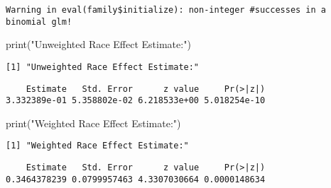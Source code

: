 \documentclass[
  letterpaper,
  DIV=11,
  numbers=noendperiod]{scrartcl}
\newenvironment{Shaded}{\begin{snugshade}}{\end{snugshade}}
\newcommand{\FunctionTok}[1]{\textcolor[rgb]{0.28,0.35,0.67}{#1}}
\newcommand{\NormalTok}[1]{\textcolor[rgb]{0.00,0.23,0.31}{#1}}
\newcommand{\SpecialCharTok}[1]{\textcolor[rgb]{0.37,0.37,0.37}{#1}}
\newcommand{\StringTok}[1]{\textcolor[rgb]{0.13,0.47,0.30}{#1}}
\begin{document}
\begin{verbatim}
Warning in eval(family$initialize): non-integer #successes in a binomial glm!
\end{verbatim}

\begin{Shaded}
\begin{Highlighting}[]
\FunctionTok{print}\NormalTok{(}\StringTok{"Unweighted Race Effect Estimate:"}\NormalTok{)}
\end{Highlighting}
\end{Shaded}

\begin{verbatim}
[1] "Unweighted Race Effect Estimate:"
\end{verbatim}

\begin{Shaded}
\end{Shaded}

\begin{verbatim}
    Estimate   Std. Error      z value     Pr(>|z|) 
3.332389e-01 5.358802e-02 6.218533e+00 5.018254e-10 
\end{verbatim}

\begin{Shaded}
\begin{Highlighting}[]
\FunctionTok{print}\NormalTok{(}\StringTok{"Weighted Race Effect Estimate:"}\NormalTok{)}
\end{Highlighting}
\end{Shaded}

\begin{verbatim}
[1] "Weighted Race Effect Estimate:"
\end{verbatim}

\begin{Shaded}
\end{Shaded}

\begin{verbatim}
    Estimate   Std. Error      z value     Pr(>|z|) 
0.3464378239 0.0799957463 4.3307030664 0.0000148634 
\end{verbatim}
\end{document}
